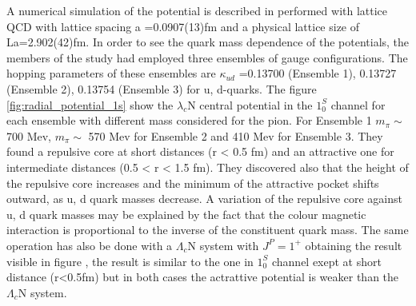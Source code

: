 \documentclass[12pt,a4paper]{book}
\begin{document}
	
	A numerical simulation of the potential is described in \cite{pot_simulation} performed with lattice QCD with lattice spacing a =0.0907(13)fm and a physical lattice size of La=2.902(42)fm. In order to see the quark mass dependence of the potentials, the members of the study had employed three ensembles of gauge configurations. The hopping parameters of these ensembles are $\kappa_{ud}$ =0.13700 (Ensemble 1), 0.13727 (Ensemble 2), 0.13754 (Ensemble 3) for u, d-quarks. The figure \ref{fig:radial_potential_1s} show the $\lambda_c$N central potential in the $1^S_0$ channel for each ensemble with different mass considered for the pion. For Ensemble 1 $m_\pi \sim$ 700 Mev, $m_\pi \sim$ 570 Mev for Ensemble 2 and 410 Mev for Ensemble 3. They found a repulsive core at short distances (r < 0.5 fm) and an attractive one for intermediate distances (0.5 < r < 1.5 fm). They discovered also that the height of the repulsive core increases and the minimum of the attractive pocket shifts outward, as u, d quark masses decrease. A variation of the repulsive core against u, d quark masses may be explained by the fact that the colour magnetic interaction is proportional to the inverse of the constituent quark mass. The same operation has also be done with a $\Lambda_c$N system with $J^P=1^+$ obtaining the result visible in figure \cite{fig:fig:radial_potential_3s}, 
	the result is similar to the one in $1^S_0$ channel exept at short distance (r<0.5fm) but in both cases the actrattive potential is weaker than the $\Lambda_c$N system.
	
\end{document}
